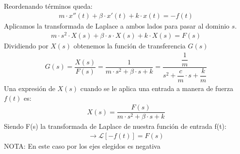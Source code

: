 \documentclass{article}
\begin{document}
Reordenando términos queda:
\begin{align*}
    m \cdot x''(t)
    + \beta \cdot x'(t)
    + k \cdot x(t) 
    = - f(t)
\end{align*}
Aplicamos la transformada de Laplace a ambos lados para pasar al dominio \(s\). 
\begin{align*}
    m \cdot s^2 \cdot X(s)
    + \beta \cdot s \cdot X(s)
    + k \cdot X(s)
    = 
    F(s)
\end{align*}
Dividiendo por \(X(s)\) obtenemos la función de transferencia \(G(s)\)
\begin{align*}
    G(s)
    =
    \dfrac{X(s)}{F(s)}
    =
    \dfrac{1}{m \cdot s^2 + \beta \cdot s + k}
    =
    \dfrac{\dfrac{1}{m}}{s^2 + \dfrac{c}{m} \cdot s + \dfrac{k}{m}}
\end{align*}
Una expresión de \(X(s)\) cuando se le aplica una entrada a manera de fuerza \(f(t)\) es:
\begin{align*}
    X(s)
    =
    \dfrac{F(s)}{m \cdot s^2 + \beta \cdot s + k}
\end{align*}
Siendo F(s) la transformada de Laplace de nuestra función de entrada f(t):
\begin{align*}
    \rightarrow\mathcal{L}[-f(t)]
    = F(s)
\end{align*}
NOTA: En este caso por los ejes elegidos es negativa
\end{document}
